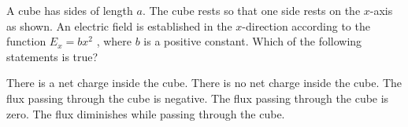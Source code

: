 \documentclass{../../oss-apphys-exam}
\begin{document}
\begin{multicols*}{2}
\begin{questions}
    
    \question A cube has sides of length $a$. The cube rests so that one side
    rests on the $x$-axis as shown. An electric field is established in the
    $x$-direction according to the function $E_x=bx^2$ , where $b$ is a positive
    constant. Which of the following statements is true?
    \label{cube1}
    \begin{choices}
      \choice There is a net charge inside the cube.
      \choice There is no net charge inside the cube.
      \choice The flux passing through the cube is negative.
      \choice The flux passing through the cube is zero.
      \choice The flux diminishes while passing through the cube.
    \end{choices}
    \vspace{.7in}
    

\end{questions}
\end{multicols*}
\end{document}
